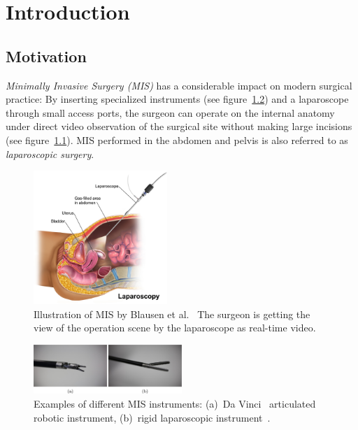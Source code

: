 \chapter{Introduction}
\label{cha:introduction}

\section{Motivation}
\emph{Minimally Invasive Surgery (MIS)} has a considerable impact on modern surgical practice:
By inserting specialized instruments (see figure~\ref{img:lap_instruments}) and a laparoscope through small access ports, the surgeon can operate on the internal anatomy under direct video observation of the surgical site without making large incisions (see figure~\ref{img:laparoscopy}). MIS performed in the abdomen and pelvis is also referred to as \emph{laparoscopic surgery}.~\cite{advances_minimal_surgery2002darzi} 

\begin{figure}
\centering
\includegraphics[width=0.45\textwidth]{images/laparoscopy_example_graphic.png}
\caption[Example MIS]{Illustration of MIS by Blausen et al.~\cite{laparosc_image2014blausen} The surgeon is getting the view of the operation scene by the laparoscope as real-time video.}
\label{img:laparoscopy}
\end{figure}

\begin{figure}
\centering
\includegraphics[width=0.5\textwidth]{images/laparoscopic_instruments.png}
\caption[Example MIS surgical instruments]{Examples of different MIS instruments: (a)~Da Vinci~\cite{da_vinci_localization2005Leven} articulated robotic instrument, (b)~rigid laparoscopic instrument~\cite{vision_based_surg_tool_det2017bouget}.}
\label{img:lap_instruments}
\end{figure}

